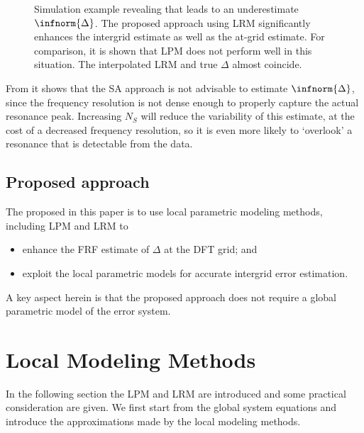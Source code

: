 \begin{figure}
  \centering
  \setlength{\figurewidth}{0.9\columnwidth}
  \setlength{\figureheight}{0.8\figurewidth}
  
  \caption{Simulation example revealing that  leads to an underestimate $\infnorm{\Delta}$. The proposed approach using \gls{LRM} significantly enhances the intergrid estimate as well as the at-grid estimate. For comparison, it is shown that \gls{LPM} does not perform well in this situation. The interpolated \gls{LRM} and true $\Delta$ almost coincide.}
  \label{fig:exampleFRF}
\end{figure}

From  it shows that the \gls{SA} approach is not advisable to estimate $\infnorm{\Delta}$, since the frequency resolution is not dense enough to properly capture the actual resonance peak.
Increasing $N_S$ will reduce the variability of this estimate, at the cost of a decreased frequency resolution, so it is even more likely to `overlook' a resonance that is detectable from the data.

\subsection{Proposed approach}
The proposed in this paper is to use local parametric modeling methods, including \gls{LPM} and \gls{LRM} to
\begin{itemize}
\item enhance the \gls{FRF} estimate of $\Delta$ at the \gls{DFT} grid; and
\item exploit the local parametric models for accurate intergrid error estimation.
\end{itemize}
A key aspect herein is that the proposed approach does not require a global parametric model of the error system.

\section{Local Modeling Methods}
\label{sec:LocalModels}
In the following section the \gls{LPM} and \gls{LRM} are introduced and some practical consideration are given.
We first start from the global system equations and introduce the approximations made by the local modeling methods.

